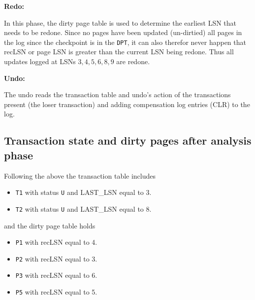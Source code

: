 \iffalse
\begin{enumerate}
\item {\tt LNS: 1} - Start of checkpoint. We here look ahead to find the
{\tt DPT} and {\tt TT}. These are found empty at {\tt LNS: 2}. The log is now
scanned until time of crash.
\item {\tt LNS: 3} - Add {\tt T1} as {\tt U} with LAST\_LSN set to {\tt 3} in {\tt TT} and {\tt P2} to {\tt DPT} with recLSN equal 3.
\item {\tt LNS: 4} - Add {\tt P1} to {\tt DPT} with recLSN equal 4 and change LAST\_LSN of
    {\tt T1} set to 4 in {\tt TT}.
\item {\tt LNS: 5} - Add {\tt T2} at {\tt U} with LAST\_LSN set to {\tt 5}
    to {\tt TT} and {\tt P5} to {\tt DPT} with recLSN equal 5.
\item {\tt LNS: 6} - Add {\tt T3} as {\tt U} with LAST\_LSN set to {\tt 6}
    to {\tt TT} and {\tt P3} to {\tt DPT}  with recLSN equal 6.
\item {\tt LNS: 7} - Change {\tt T3} to {\tt C} and change LAST\_LSN to 7 in {\tt TT}.
\item {\tt LNS: 8} - Change LAST\_LSN of {\tt T2} to 8 in {\tt TT}.
\item {\tt LNS: 9} - Change LAST\_LSN of {\tt T2} to 9 in {\tt TT}.
\item {\tt LNS: 10} - Remove {\tt T3} from {\tt TT}.
\end{enumerate}
\fi

\noindent
{\bf Redo:}

In this phase, the dirty page table is used to determine the earliest LSN that needs to be redone. Since no pages have been updated (un-dirtied) all pages in the log since the checkpoint is in the {\tt DPT}, it can also therefor never happen that recLSN or page LSN is greater than the current LSN being redone. Thus all updates logged at LSNs $3,4,5,6,8,9$ are redone.

\noindent
{\bf Undo:}

The undo reads the transaction table and undo's action of the transactions present (the loser transaction) and adding compensation log entries (CLR) to the log.

\subsection{Transaction state and dirty pages after analysis phase}
Following the above the transaction table includes
\begin{itemize}
\item {\tt T1} with status {\tt U} and LAST\_LSN equal to 3.
\item {\tt T2} with status {\tt U} and LAST\_LSN equal to 8.
\end{itemize}
and the dirty page table holds
\begin{itemize}
\item {\tt P1} with recLSN equal to 4.
\item {\tt P2} with recLSN equal to 3.
\item {\tt P3} with recLSN equal to 6.
\item {\tt P5} with recLSN equal to 5.
\end{itemize}

